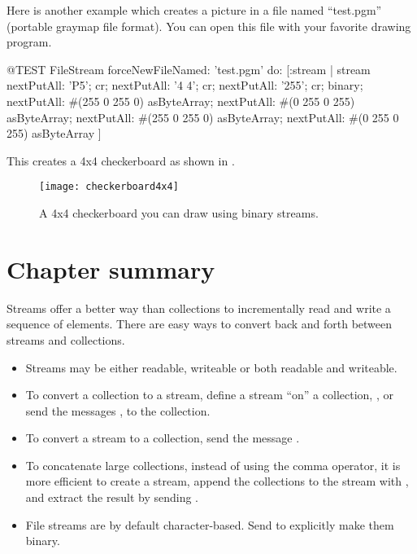 \documentclass[a4paper,10pt,twoside]{book}
\begin{document}
Here is another example which creates a picture in a file named
``test.pgm'' (portable graymap file format). You can open this file with your favorite drawing program.

\begin{code}{@TEST}
FileStream
  forceNewFileNamed: 'test.pgm' 
  do: [:stream |
	stream
		nextPutAll: 'P5'; cr;
		nextPutAll: '4 4'; cr;
		nextPutAll: '255'; cr;
		binary;
		nextPutAll: #(255 0 255 0) asByteArray;
		nextPutAll: #(0 255 0 255) asByteArray;
		nextPutAll: #(255 0 255 0) asByteArray;
		nextPutAll: #(0 255 0 255) asByteArray
	]
\end{code}

This creates a 4x4 checkerboard as shown in .

\begin{figure}[!ht]
\centerline{\texttt{[image: checkerboard4x4]}}
\caption{A 4x4 checkerboard you can draw using binary streams.}
\vspace{.2in}
\end{figure}

\section{Chapter summary}

Streams offer a better way than collections to incrementally read and write a sequence of elements. There are easy ways to convert back and forth between streams and collections.

\begin{itemize}
  \item Streams may be either readable, writeable or both readable and writeable.
  \item To convert a collection to a stream, define a stream ``on'' a collection, \eg {}, or send the messages , \etc to the collection.
  \item To convert a stream to a collection, send the message .
  \item To concatenate large collections, instead of using the comma operator, it is more efficient to create a stream, append the collections to the stream with , and extract the result by sending .
  \item File streams are by default character-based. Send  to explicitly make them binary.
\end{itemize}

\ifx\wholebook\relax\else
\end{document}
